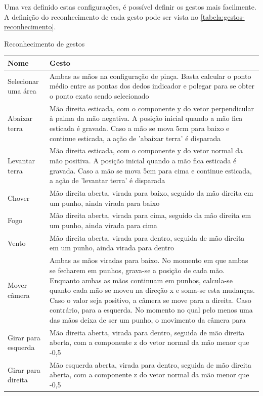 Uma vez definido estas configurações, é possível definir os gestos mais 
facilmente. A definição do reconhecimento de cada gesto pode ser vista 
no \autoref{tabela:gestos-reconhecimento}.

\begin{quadro}[htb] \scriptsize
	\centering
	\caption[Reconhecimento de gestos]{Reconhecimento de gestos}
	
	\begin{tabular}{|>{\centering\arraybackslash}m{2.1cm}|>{\centering\arraybackslash}m{12.8cm}|}
		\hline 
		\textbf{Nome} & \textbf{Gesto} \\
		\hline 
		Selecionar uma área
		&Ambas as mãos na configuração de pinça. Basta calcular o 
		ponto médio entre as pontas dos dedos indicador e polegar 
		para se obter o ponto exato sendo selecionado
		\\ \hline 
		Abaixar terra
		&Mão direita esticada, com o componente y do vetor perpendicular 
		à palma da mão negativa. A posição inicial quando a mão fica 
		esticada é gravada. Caso a mão se mova 5cm para baixo e 
		continue esticada, a ação de 'abaixar terra' é disparada
		\\ \hline 
		Levantar terra
		&Mão direita esticada, com o componente y do vetor normal da 
		mão positiva. A posição inicial quando a mão fica esticada é 
		gravada. Caso a mão se mova 5cm para cima e continue esticada, 
		a ação de 'levantar terra' é disparada
		\\ \hline 
		Chover
		&Mão direita aberta, virada para baixo, seguido da mão direita 
		em um punho, ainda virada para baixo
		\\ \hline 
		Fogo
		&Mão direita aberta, virada para cima, seguido da mão direita 
		em um punho, ainda virada para cima
		\\ \hline 		
		Vento
		&Mão direita aberta, virada para dentro, seguida de mão direita 
		em um punho, ainda virada para dentro
		\\ \hline 
		Mover câmera
		&Ambas as mãos viradas para baixo. No momento em que ambas 
		se fecharem em punhos, grava-se a posição de cada mão. 
		Enquanto ambas as mãos continuam em punhos, calcula-se quanto 
		cada mão se moveu na direção x e soma-se esta mudanças. 
		Caso o valor seja positivo, a câmera se move para a direita. 
		Caso contrário, para a esquerda. No momento no qual pelo 
		menos uma das mãos deixa de ser um punho, o movimento da câmera para
		\\ \hline 
		Girar para esquerda
		&Mão direita aberta, virada para dentro, seguida de mão 
		direita aberta, com a componente z do vetor normal da mão 
		menor que -0,5
		\\ \hline 
		Girar para direita
		&Mão esquerda aberta, virada para dentro, seguida de mão 
		direita aberta, com a componente z do vetor normal da mão 
		menor que -0,5
		\\ \hline 
	\end{tabular} 
	
	\legend{\fonteAP}
	\label{tabela:gestos-reconhecimento}
\end{quadro}

